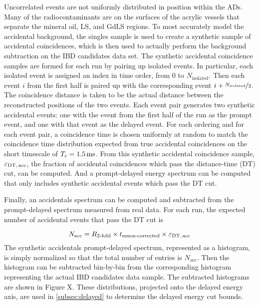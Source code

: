 
Uncorrelated events are not uniformly distributed
in position within the ADs.
Many of the radiocontaminants are on the surfaces of the
acrylic vessels that separate the mineral oil, LS, and GdLS regions.
To most accurately model the accidental background,
the singles sample is used to create a synthetic sample of accidental coincidences,
which is then used to actually perform the background subtraction
on the IBD candidates data set.
The synthetic accidental coincidence samples are formed for each run
by pairing up isolated events.
In particular, each isolated event is assigned an index in time order,
from $0$ to $N_{\text{isolated}}$.
Then each event $i$ from the first half is paired up with
the corresponding event $i + \nicefrac{N_{\text{isolated}}}{2}$.
The coincidence distance is taken to be the actual distance
between the reconstructed positions of the two events.
Each event pair generates two synthetic accidental events:
one with the event from the first half of the run as the prompt event,
and one with that event as the delayed event.
For each ordering and for each event pair, a coincidence time is chosen
uniformly at random to match the coincidence time distribution
expected from true accidental coincidences on the short timescale
of $T_c=\SI{1.5}{\milli\second}$.
From this synthetic accidental coincidence sample, $\varepsilon_{\text{DT,\,acc}}$,
the fraction of accidental  coincidences which pass the distance-time (DT) cut,
can be computed.
And a prompt-delayed energy spectrum can be computed that only includes
synthetic accidental events which pass the DT cut. %

Finally, an accidentals spectrum can be computed and subtracted
from the prompt-delayed spectrum measured from real data.
For each run, the expected number of accidental events that pass the DT cut is

\begin{equation*}
    N_{\text{acc}} = R_{\text{\ensuremath{2}-fold}} \times t_{\text{muon-corrected}}
        \times \varepsilon_{\text{DT,\,acc}}
\end{equation*}
The synthetic accidentals prompt-delayed spectrum, represented as a histogram,
is simply normalized so that the total number of entries is $N_{\text{acc}}$.
Then the histogram can be subtracted bin-by-bin from the corresponding histogram
representing the actual IBD candidates data sample.
The subtracted histograms are shown in Figure X. %
These distributions, projected onto the delayed energy axis,
are used in \cref{subsec:delayed} to determine the delayed energy cut bounds.

